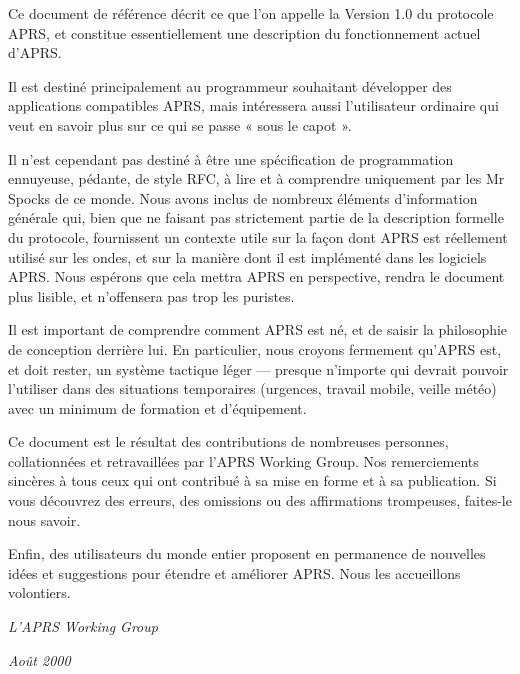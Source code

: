 \begin{aprsbodyblock}
Ce document de référence décrit ce que l'on appelle la Version 1.0 du
protocole APRS, et constitue essentiellement une description du
fonctionnement actuel d'APRS.

Il est destiné principalement au programmeur souhaitant développer des
applications compatibles APRS, mais intéressera aussi l'utilisateur
ordinaire qui veut en savoir plus sur ce qui se passe « sous le capot ».

Il n'est cependant pas destiné à être une spécification de programmation
ennuyeuse, pédante, de style RFC, à lire et à comprendre uniquement par
les Mr Spocks de ce monde. Nous avons inclus de nombreux éléments
d'information générale qui, bien que ne faisant pas strictement partie
de la description formelle du protocole, fournissent un contexte utile
sur la façon dont APRS est réellement utilisé sur les ondes, et sur la
manière dont il est implémenté dans les logiciels APRS. Nous espérons
que cela mettra APRS en perspective, rendra le document plus lisible, et
n'offensera pas trop les puristes.

Il est important de comprendre comment APRS est né, et de saisir la
philosophie de conception derrière lui. En particulier, nous croyons
fermement qu'APRS est, et doit rester, un système tactique léger ---
presque n'importe qui devrait pouvoir l'utiliser dans des situations
temporaires (urgences, travail mobile, veille météo) avec un minimum de
formation et d'équipement.

Ce document est le résultat des contributions de nombreuses personnes,
collationnées et retravaillées par l'APRS Working Group. Nos
remerciements sincères à tous ceux qui ont contribué à sa mise en forme
et à sa publication. Si vous découvrez des erreurs, des omissions ou des
affirmations trompeuses, faites-le nous savoir.

Enfin, des utilisateurs du monde entier proposent en permanence de
nouvelles idées et suggestions pour étendre et améliorer APRS. Nous les
accueillons volontiers.

\emph{L'APRS Working Group}

\emph{Août 2000}
\end{aprsbodyblock}

